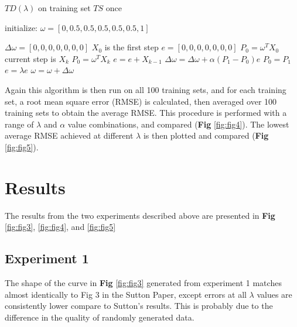 \documentclass[10pt]{article}
\begin{document}
\begin{algorithm}
\caption{$TD(\lambda)$ on training set $TS$ once}
\begin{algorithmic}
\STATE initialize: $\omega=[0,0.5,0.5,0.5,0.5,0.5,1]$

\STATE $\Delta\omega=[0,0,0,0,0,0,0]$
\STATE $X_0$ is the first step
\STATE $e=[0,0,0,0,0,0,0]$
\STATE $P_0=\omega^T X_0$
\STATE current step is $X_k$
\STATE $P_0=\omega^T X_k$
\STATE $e=e+X_{k-1}$
\STATE $\Delta\omega=\Delta\omega+\alpha (P_1-P_0)e$
\STATE $P_0=P_1$
\STATE $e=\lambda e$
\ENDFOR
\STATE $\omega=\omega+\Delta\omega$
\ENDFOR


\end{algorithmic}
\end{algorithm}

Again this algorithm is then run on all 100 training sets, and for each training set, a root mean square error (RMSE) is calculated, then averaged over 100 training sets to obtain the average RMSE. This procedure is performed with a range of $\lambda$ and $\alpha$ value combinations, and compared (\textbf{Fig} \ref{fig:fig4}). The lowest average RMSE achieved at different $\lambda$ is then plotted and compared (\textbf{Fig} \ref{fig:fig5}).




\section{Results} \label{results}

The results from the two experiments described above are presented in \textbf{Fig} \ref{fig:fig3}, \ref{fig:fig4}, and \ref{fig:fig5}


\subsection{Experiment 1} \label{results1}
The shape of the curve in \textbf{Fig} \ref{fig:fig3} generated from experiment 1 matches almost identically to Fig 3 in the Sutton Paper, except errors at all $\lambda$ values are consistently lower compare to Sutton's results. This is probably due to the difference in the quality of randomly generated data.
\end{document}
